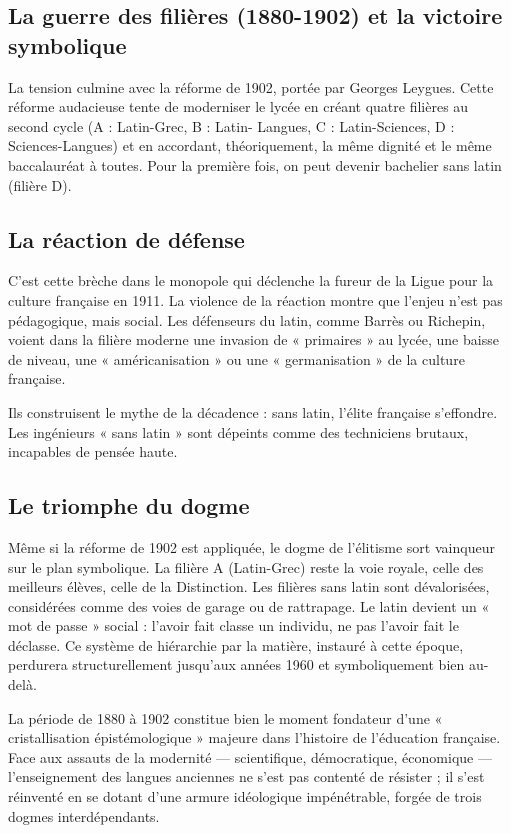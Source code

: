 \subsection{La guerre des filières (1880-1902) et la victoire symbolique}

La tension culmine avec la réforme de 1902, portée par Georges Leygues. Cette réforme audacieuse
tente de moderniser le lycée en créant quatre filières au second cycle (A : Latin-Grec, B : Latin-
Langues, C : Latin-Sciences, D : Sciences-Langues) et en accordant, théoriquement, la même dignité
et le même baccalauréat à toutes.\cite{I-1-3-ref14} Pour la première fois, on peut devenir bachelier
sans latin (filière D).



\subsection{La réaction de défense}

C'est cette brèche dans le monopole qui déclenche la fureur de la Ligue pour la culture française en
1911. La violence de la réaction montre que l'enjeu n'est pas pédagogique, mais social. Les
défenseurs du latin, comme Barrès ou Richepin, voient dans la filière moderne une invasion de «
primaires » au lycée, une baisse de niveau, une « américanisation » ou une « germanisation » de la
culture française.\cite{I-1-3-ref18}

Ils construisent le mythe de la décadence : sans latin, l'élite française s'effondre. Les ingénieurs
« sans latin » sont dépeints comme des techniciens brutaux, incapables de pensée haute.



\subsection{Le triomphe du dogme}

Même si la réforme de 1902 est appliquée, le dogme de l'élitisme sort vainqueur sur le plan
symbolique. La filière A (Latin-Grec) reste la voie royale, celle des meilleurs élèves, celle de la
Distinction. Les filières sans latin sont dévalorisées, considérées comme des voies de garage ou de
rattrapage. Le latin devient un « mot de passe » social : l'avoir fait classe un individu, ne pas
l'avoir fait le déclasse. Ce système de hiérarchie par la matière, instauré à cette époque,
perdurera structurellement jusqu'aux années 1960 et symboliquement bien au-delà.

La période de 1880 à 1902 constitue bien le moment fondateur d'une « cristallisation épistémologique
» majeure dans l'histoire de l'éducation française. Face aux assauts de la modernité — scientifique,
démocratique, économique — l'enseignement des langues anciennes ne s'est pas contenté de résister ;
il s'est réinventé en se dotant d'une armure idéologique impénétrable, forgée de trois dogmes
interdépendants.

